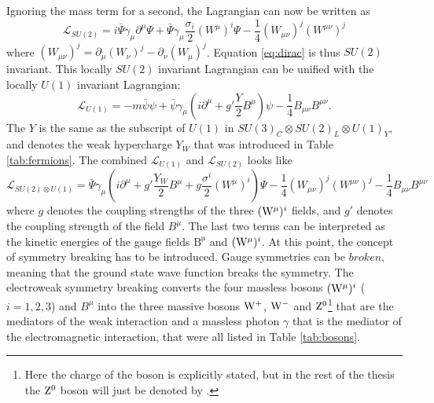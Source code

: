 Ignoring the mass term for a second, the Lagrangian can now be written as
\begin{equation}
\mathcal{L}_{SU(2)}=i\bar{\Psi}\gamma_{\mu}\partial^{\mu}\Psi+ \bar{\Psi}\gamma_{\mu}\frac{\sigma_{i}}{2}(W^{\mu})^{i}\Psi-\frac{1}{4}(W_{\mu\nu})^{j}(W^{\mu\nu})^{j} 
\label{eq:dirac}
\end{equation}                                               
where $(W_{\mu\nu})^{j}=\partial_{\mu}(W_{\nu})^{j}-\partial_{\nu}(W_{\mu})^{j}$. 
Equation \ref{eq:dirac} is thus $SU(2)$ invariant.  
This locally $SU(2)$ invariant Lagrangian can be unified with the locally $U(1)$ invariant Lagrangian:
\begin{equation}
\mathcal{L}_{U(1)}=-m\bar{\psi}\psi+\bar{\psi}\gamma_{\mu}(i\partial^{\mu}+g'\frac{Y}{2}B^{\mu})\psi-\frac{1}{4}B_{\mu\nu}B^{\mu\nu}.
\end{equation}                                               
The $Y$ is the same as the subscript of $U(1)$ in $SU(3)_{C}\otimes SU(2)_{L}\otimes U(1)_{Y}$, and denotes the weak hypercharge $Y_{W}$ that was introduced in Table \ref{tab:fermions}. 
The combined $\mathcal{L}_{U(1)}$ and $\mathcal{L}_{SU(2)}$ looks like
\begin{equation}
\mathcal{L}_{SU(2)\otimes U(1)}=\bar{\Psi}\gamma_{\mu}(i\partial^{\mu}+g'\frac{Y_{W}}{2}B^{\mu}+g\frac{\sigma^{i}}{2}(W^{\mu})^{i})\Psi-\frac{1}{4}(W_{\mu\nu})^{j}(W^{\mu\nu})^{j}-\frac{1}{4}B_{\mu\nu}B^{\mu\nu} 
\label{eq:ewkLagrange}
\end{equation}                                                
where $g$ denotes the coupling strengths of the three $(\mathrm{W}^{\mu})^{i}$ fields, and $g'$ denotes the coupling strength of the field $B^{\mu}$. 
The last two terms can be interpreted as the kinetic energies of the gauge fields $\mathrm{B^{\mu}}$ and $(\mathrm{W}^{\mu})^{i}$.
\newpara
\noindent\justify
At this point, the concept of symmetry breaking has to be introduced. 
Gauge symmetries can be $broken$, meaning that the ground state wave function breaks the symmetry. 
The electroweak symmetry breaking converts the four massless bosons $(\mathrm{W}^{\mu})^{i}$ ($i=1,2,3$) and $B^{\mu}$ into the three massive bosons $\mathrm{W}^{+}$, $\mathrm{W}^{-}$ and $\mathrm{Z}^{0}$\footnote{Here the charge of the \PZ boson is explicitly stated, but in the rest of the thesis the $\mathrm{Z}^{0}$ boson will just be denoted by \PZ.} that are the mediators of the weak interaction and a massless photon $\gamma$ that is the mediator of the electromagnetic interaction, that were all listed in Table \ref{tab:bosons}. 
